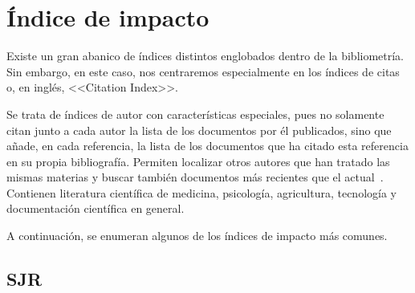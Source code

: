  
\section{Índice de impacto}

Existe un gran abanico de índices distintos englobados dentro de la bibliometría. Sin embargo, en este caso, nos centraremos especialmente en los índices de citas o, en inglés, <<Citation Index>>.

Se trata de índices de autor con características especiales, pues no solamente citan junto a cada autor la lista de los documentos por él publicados, sino que añade, en cada referencia, la lista de los documentos que ha citado esta referencia en su propia bibliografía. Permiten localizar otros autores que han tratado las mismas materias y buscar también documentos más recientes que el actual~\cite{Amat1989}. Contienen literatura científica de medicina, psicología, agricultura, tecnología y documentación científica en general. 

A continuación, se enumeran algunos de los índices de impacto más comunes.









\subsection{SJR}

